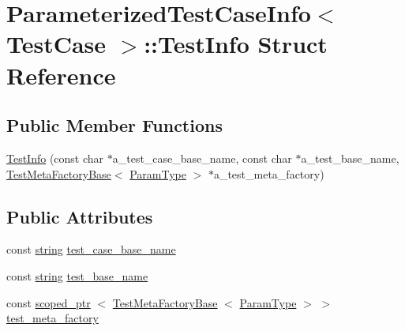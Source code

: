 \hypertarget{structtesting_1_1internal_1_1ParameterizedTestCaseInfo_1_1TestInfo}{\section{\-Parameterized\-Test\-Case\-Info$<$ \-Test\-Case $>$\-:\-:\-Test\-Info \-Struct \-Reference}
\label{d1/d02/structtesting_1_1internal_1_1ParameterizedTestCaseInfo_1_1TestInfo}
}
\subsection*{\-Public \-Member \-Functions}
\begin{DoxyCompactItemize}
\item 
\hyperlink{structtesting_1_1internal_1_1ParameterizedTestCaseInfo_1_1TestInfo_af7213df2e39f03ce2435c65d9486c2c7}{\-Test\-Info} (const char $\ast$a\-\_\-test\-\_\-case\-\_\-base\-\_\-name, const char $\ast$a\-\_\-test\-\_\-base\-\_\-name, \hyperlink{classtesting_1_1internal_1_1TestMetaFactoryBase}{\-Test\-Meta\-Factory\-Base}$<$ \hyperlink{classtesting_1_1internal_1_1ParameterizedTestCaseInfo_ab50f5599aaeeb72dd821ed2d71ad8e35}{\-Param\-Type} $>$ $\ast$a\-\_\-test\-\_\-meta\-\_\-factory)
\end{DoxyCompactItemize}
\subsection*{\-Public \-Attributes}
\begin{DoxyCompactItemize}
\item 
const \hyperlink{namespacetesting_1_1internal_a9882e571372fc19a02d2b2949e1f1557}{string} \hyperlink{structtesting_1_1internal_1_1ParameterizedTestCaseInfo_1_1TestInfo_ad387297e8245f0d25f0dafc57b4bffc0}{test\-\_\-case\-\_\-base\-\_\-name}
\item 
const \hyperlink{namespacetesting_1_1internal_a9882e571372fc19a02d2b2949e1f1557}{string} \hyperlink{structtesting_1_1internal_1_1ParameterizedTestCaseInfo_1_1TestInfo_a38795400af22b1fe5ae8dbdc87f597ca}{test\-\_\-base\-\_\-name}
\item 
const \hyperlink{classtesting_1_1internal_1_1scoped__ptr}{scoped\-\_\-ptr}\*
$<$ \hyperlink{classtesting_1_1internal_1_1TestMetaFactoryBase}{\-Test\-Meta\-Factory\-Base}\*
$<$ \hyperlink{classtesting_1_1internal_1_1ParameterizedTestCaseInfo_ab50f5599aaeeb72dd821ed2d71ad8e35}{\-Param\-Type} $>$ $>$ \hyperlink{structtesting_1_1internal_1_1ParameterizedTestCaseInfo_1_1TestInfo_acbf484daea0af30a8b690b7291e606ec}{test\-\_\-meta\-\_\-factory}
\end{DoxyCompactItemize}


